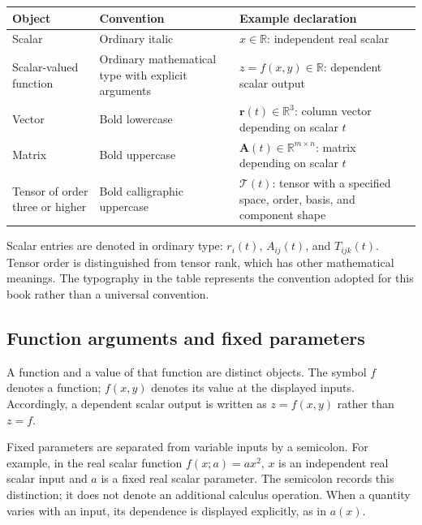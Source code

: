 \documentclass[11pt,oneside,openany]{book}
\begin{document}
\begingroup\small\setlength{\tabcolsep}{5pt}\renewcommand{\arraystretch}{1.15}
\begin{tabular}{@{}>{\raggedright\arraybackslash}p{}>{\raggedright\arraybackslash}p{}>{\raggedright\arraybackslash}p{}@{}}
\textbf{Object} & \textbf{Convention} & \textbf{Example declaration} \\[5pt]
\hline
Scalar & Ordinary italic & \(x\in\mathbb R\): independent real scalar \\[5pt]
Scalar-valued function & Ordinary mathematical type with explicit arguments & \(z=f(x,y)\in\mathbb R\): dependent scalar output \\[5pt]
Vector & Bold lowercase & \(\mathbf r(t)\in\mathbb R^3\): column vector depending on scalar \(t\) \\[5pt]
Matrix & Bold uppercase & \(\mathbf A(t)\in\mathbb R^{m\times n}\): matrix depending on scalar \(t\) \\[5pt]
Tensor of order three or higher & Bold calligraphic uppercase & \(\boldsymbol{\mathcal T}(t)\): tensor with a specified space, order, basis, and component shape \\[5pt]
\end{tabular}\endgroup

Scalar entries are denoted in ordinary type: \(r_i(t)\), \(A_{ij}(t)\), and
\(T_{ijk}(t)\). Tensor order is distinguished from tensor rank, which has other
mathematical meanings. The typography in the table represents the convention
adopted for this book rather than a universal convention.

\subsection{Function arguments and fixed parameters}

A function and a value of that function are distinct objects. The symbol \(f\)
denotes a function; \(f(x,y)\) denotes its value at the displayed inputs.
Accordingly, a dependent scalar output is written as \(z=f(x,y)\) rather than
\(z=f\).

Fixed parameters are separated from variable inputs by a semicolon. For
example, in the real scalar function \(f(x;a)=ax^2\), \(x\) is an independent real
scalar input and \(a\) is a fixed real scalar parameter. The semicolon records
this distinction; it does not denote an additional calculus operation.
When a quantity varies with an input, its dependence is displayed explicitly,
as in \(a(x)\).
\end{document}
